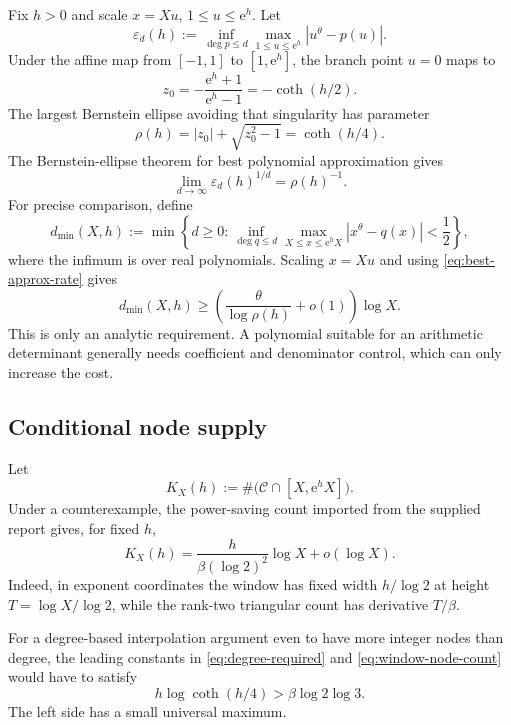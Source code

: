 \documentclass[11pt,oneside]{article}
\theoremstyle{definition}
\theoremstyle{remark}
\newcommand{\Cand}{\mathcal C}
\newcommand{\e}{\mathrm e}
\begin{document}
Fix $h>0$ and scale $x=Xu$, $1\le u\le\e^h$.  Let
\[
  \varepsilon_d(h)
  :=\inf_{\deg p\le d}\max_{1\le u\le\e^h}|u^\theta-p(u)|.
\]
Under the affine map from $[-1,1]$ to $[1,\e^h]$, the branch point $u=0$ maps to
\[
  z_0=-\frac{\e^h+1}{\e^h-1}=-\coth(h/2).
\]
The largest Bernstein ellipse avoiding that singularity has parameter
\begin{equation}
  \rho(h)=|z_0|+\sqrt{z_0^2-1}=\coth(h/4).
  \label{eq:rho-h}
\end{equation}
The Bernstein-ellipse theorem for best polynomial approximation \cite{Trefethen2013} gives
\begin{equation}
  \lim_{d\to\infty}\varepsilon_d(h)^{1/d}=\rho(h)^{-1}.
  \label{eq:best-approx-rate}
\end{equation}
For precise comparison, define
\[
 d_{\min}(X,h):=
 \min\left\{d\ge0:
   \inf_{\deg q\le d}\max_{X\le x\le\e^hX}
      |x^\theta-q(x)|<\frac12
 \right\},
\]
where the infimum is over real polynomials.  Scaling $x=Xu$ and using \eqref{eq:best-approx-rate} gives
\begin{equation}
  d_{\min}(X,h)\ge
  \left(\frac{\theta}{\log\rho(h)}+o(1)\right)\log X.
  \label{eq:degree-required}
\end{equation}
This is only an analytic requirement.  A polynomial suitable for an arithmetic determinant generally needs coefficient and denominator control, which can only increase the cost.

\subsection{Conditional node supply}

Let
\[
 K_X(h):=\#\bigl(\Cand\cap[X,\e^hX]\bigr).
\]
Under a counterexample, the power-saving count imported from the supplied report gives, for fixed $h$,
\begin{equation}
 K_X(h)
 =\frac{h}{\beta(\log2)^2}\log X+o(\log X).
 \label{eq:window-node-count}
\end{equation}
Indeed, in exponent coordinates the window has fixed width $h/\log2$ at height $T=\log X/\log2$, while the rank-two triangular count has derivative $T/\beta$.

For a degree-based interpolation argument even to have more integer nodes than degree, the leading constants in \eqref{eq:degree-required} and \eqref{eq:window-node-count} would have to satisfy
\begin{equation}
  h\log\coth(h/4)>\beta\log2\log3.
  \label{eq:required-capacity}
\end{equation}
The left side has a small universal maximum.
\end{document}
